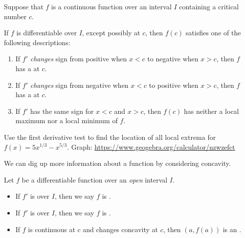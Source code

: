 \documentclass[../main.tex]{subfiles}
\begin{document}
  \begin{mdframed}[style=withref-compact]
    Suppose that \(f\) is a continuous function over an interval \(I\) containing a critical number \(c\). 

    If \(f\) is differentiable over \(I\), except possibly at \(c\), then \(f(c)\) satisfies one of the following descriptions:
    \begin{enumerate}
      \item If \(f'\) \emph{changes} sign from positive when \(x < c\) to negative when \(x > c\), then \(f\) has a \underline{\hspace{2in}} at \(c\).
      \item If \(f'\) \emph{changes} sign from negative when \(x < c\) to positive when \(x > c\), then \(f\) has a \underline{\hspace{2in}} at \(c\).
      \item If \(f'\) has the same sign for \(x < c\) and \(x > c\), then \(f(c)\) has neither a local maximum nor a local minimum of \(f\).
    \end{enumerate}

  \end{mdframed}

  \begin{example} \label{ex:first-derivative}
    Use the first derivative test to find the location of all local extrema for \(f(x) = 5x^{1/3} - x^{5/3}\). Graph: \url{https://www.geogebra.org/calculator/nzwzefct}

  \end{example}
  \clearpage

  We can dig up more information about a function by considering concavity.
  \begin{mdframed}[style=withref-compact]
    Let \(f\) be a differentiable function over an \emph{open} interval \(I\).
    \begin{itemize}
      \item If \(f'\) is \underline{\hspace{1in}} over \(I\), then we say \(f\) is .
      \item If \(f'\) is \underline{\hspace{1in}} over \(I\), then we say \(f\) is .
      \item If \(f\) is continuous at \(c\) and changes concavity at \(c\), then \((a,f(a))\) is an . 
    \end{itemize}

  \end{mdframed}
\end{document}
